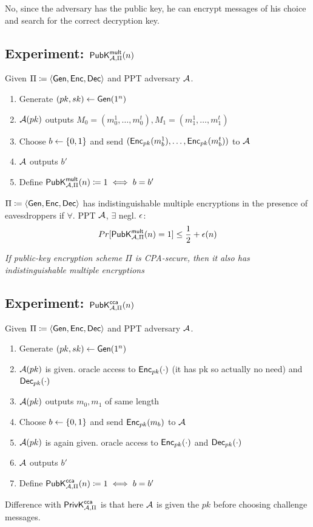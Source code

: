 \documentclass[12pt]{article}
\begin{document}
No, since the adversary has the public key, he can encrypt messages of his choice and search for the correct decryption key.
\newpage

\subsection{Experiment: $\mathsf{PubK}_{\mathcal{A},\Pi}^\mathsf{mult}(n)$}
Given $\Pi \coloneqq \langle \operatorname{\mathsf{Gen}}, \operatorname{\mathsf{Enc}}, \operatorname{\mathsf{Dec}} \rangle$ and PPT adversary $\mathcal{A}$.

\begin{enumerate}
	\item Generate $(pk,sk) \leftarrow \operatorname{\mathsf{Gen}}(1^n)$
	\item $\mathcal{A}(pk)$ outputs $M_0 = (m_0^1,\dots,m_0^t), M_1=(m_1^1,\dots,m_1^t)$ 
	\item Choose $b\leftarrow \{0, 1\}$ and send $(\operatorname{\mathsf{Enc}}_{pk}(m_b^1),\dots,\operatorname{\mathsf{Enc}}_{pk}(m_b^t))$ to $\mathcal{A}$
	\item $\mathcal{A}$ outputs $b'$
	\item Define $\mathsf{PubK}_{\mathcal{A},\Pi}^\mathsf{mult}(n)\coloneqq 1 \iff b=b'$
\end{enumerate}

$\Pi \coloneqq \langle \operatorname{\mathsf{Gen}}, \operatorname{\mathsf{Enc}}, \operatorname{\mathsf{Dec}} \rangle$ has indistinguishable multiple encryptions in the presence of eavesdroppers if $\forall$. PPT $\mathcal{A}$, $\exists$ negl. $\epsilon$:
\begin{equation*}
Pr[\mathsf{PubK}_{\mathcal{A},\Pi}^\mathsf{mult}(n)=1] \le \frac12 + \epsilon(n)
\end{equation*}

\emph{If public-key encryption scheme $\Pi$ is CPA-secure, then it also has indistinguishable multiple encryptions}

\subsection{Experiment: $\mathsf{PubK}_{\mathcal{A},\Pi}^\mathsf{cca}(n)$}
Given $\Pi \coloneqq \langle \operatorname{\mathsf{Gen}}, \operatorname{\mathsf{Enc}}, \operatorname{\mathsf{Dec}} \rangle$ and PPT adversary $\mathcal{A}$.
\begin{enumerate}
\item Generate $(pk,sk) \leftarrow \operatorname{\mathsf{Gen}}(1^n)$
\item $\mathcal{A}(pk)$ is given. oracle access to $\operatorname{\mathsf{Enc}}_{pk}(\cdot)$ (it has pk so actually no need) and $\operatorname{\mathsf{Dec}}_{pk}(\cdot)$
\item $\mathcal{A}(pk)$ outputs $m_0, m_1$ of same length
\item Choose $b\leftarrow \{0, 1\}$ and send $\operatorname{\mathsf{Enc}}_{pk}(m_b)$ to $\mathcal{A}$
\item $\mathcal{A}(pk)$ is again given. oracle access to $\operatorname{\mathsf{Enc}}_{pk}(\cdot)$ and $\operatorname{\mathsf{Dec}}_{pk}(\cdot)$
\item $\mathcal{A}$ outputs $b'$
\item Define $\mathsf{PubK}_{\mathcal{A},\Pi}^\mathsf{cca}(n)\coloneqq 1 \iff b=b'$
\end{enumerate}
Difference with $\mathsf{PrivK}_{\mathcal{A},\Pi}^\mathsf{cca}$ is that here $\mathcal{A}$ is given the $pk$ before choosing challenge messages.
\end{document}
